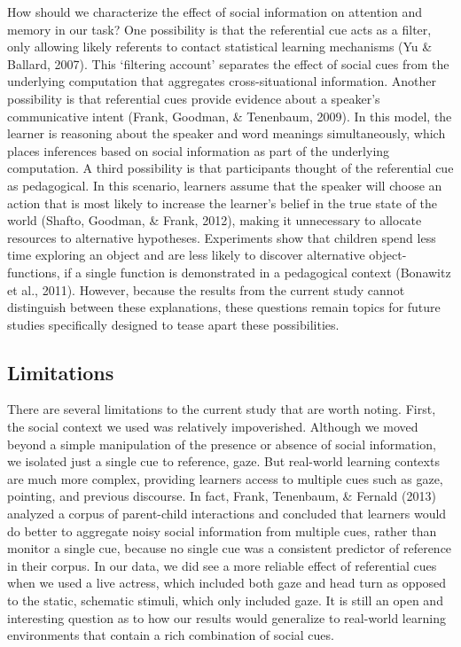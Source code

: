 \documentclass[authoryear, review]{elsarticle}
\begin{document}
How should we characterize the effect of social information on attention
and memory in our task? One possibility is that the referential cue acts
as a filter, only allowing likely referents to contact statistical
learning mechanisms (Yu \& Ballard, 2007). This `filtering account'
separates the effect of social cues from the underlying computation that
aggregates cross-situational information. Another possibility is that
referential cues provide evidence about a speaker's communicative intent
(Frank, Goodman, \& Tenenbaum, 2009). In this model, the learner is
reasoning about the speaker and word meanings simultaneously, which
places inferences based on social information as part of the underlying
computation. A third possibility is that participants thought of the
referential cue as pedagogical. In this scenario, learners assume that
the speaker will choose an action that is most likely to increase the
learner's belief in the true state of the world (Shafto, Goodman, \&
Frank, 2012), making it unnecessary to allocate resources to alternative
hypotheses. Experiments show that children spend less time exploring an
object and are less likely to discover alternative object-functions, if
a single function is demonstrated in a pedagogical context (Bonawitz et
al., 2011). However, because the results from the current study cannot
distinguish between these explanations, these questions remain topics
for future studies specifically designed to tease apart these
possibilities.

\subsection{Limitations}\label{limitations}

There are several limitations to the current study that are worth
noting. First, the social context we used was relatively impoverished.
Although we moved beyond a simple manipulation of the presence or
absence of social information, we isolated just a single cue to
reference, gaze. But real-world learning contexts are much more complex,
providing learners access to multiple cues such as gaze, pointing, and
previous discourse. In fact, Frank, Tenenbaum, \& Fernald (2013)
analyzed a corpus of parent-child interactions and concluded that
learners would do better to aggregate noisy social information from
multiple cues, rather than monitor a single cue, because no single cue
was a consistent predictor of reference in their corpus. In our data, we
did see a more reliable effect of referential cues when we used a live
actress, which included both gaze and head turn as opposed to the
static, schematic stimuli, which only included gaze. It is still an open
and interesting question as to how our results would generalize to
real-world learning environments that contain a rich combination of
social cues.
\end{document}
